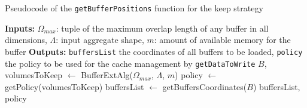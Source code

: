 \documentclass[conference]{IEEEtran}
\begin{document}
\begin{algorithm}
  \caption{Pseudocode of the \texttt{getBufferPositions} function for the keep strategy}
  \label{algo:getbuffersposition}
  \begin{algorithmic}[1]
  \STATE \textbf{Inputs:} $\Omega_{max}$: tuple of the maximum overlap length
  of any buffer in all dimensions, $\Lambda$: input aggregate shape,
  $m$: amount of available memory for the buffer
  \STATE \textbf{Outputs:} \texttt{buffersList} the coordinates of all buffers to be loaded,
  \texttt{policy} the policy to be used for the cache management by \texttt{getDataToWrite}
  \STATE $B$, volumesToKeep $\leftarrow$ BufferExtAlg($\Omega_{max}$, $\Lambda$, $m$)
  \STATE policy $\leftarrow$ getPolicy(volumesToKeep)
  \STATE buffersList $\leftarrow$ getBuffersCoordinates($B$)
  \RETURN buffersList, policy
  \end{algorithmic}
\end{algorithm}
\end{document}
